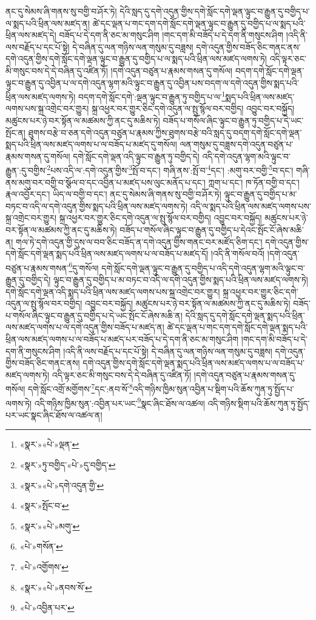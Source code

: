 ནང་དུ་སེམས་ཞི་གནས་སུ་བགྱི་བ་ཤོར་ཏེ། དེའི་སླད་དུ་དགེ་འདུན་གྱིས་དགེ་སློང་དགེ་ལྡན་ལྟུང་བ་རྒྱུན་དུ་བགྱིད་པ་ལ་སྨད་པའི་ཕྲིན་ལས་མཛད་ན། ཚེ་དང་ལྡན་པ་གང་དག་དགེ་སློང་དགེ་ལྡན་ལྟུང་བ་རྒྱུན་དུ་བགྱིད་པ་ལ་སྨད་པའི་ཕྲིན་ལས་མཛད་དེ། བཟོད་པ་དེ་དག་ནི་ཅང་མ་གསུང་ཤིག །གང་དག་མི་བཟོད་པ་དེ་དག་ནི་གསུངས་ཤིག །འདི་ནི་ལས་བརྗོད་པ་དང་པོ་སྟེ། དེ་བཞིན་དུ་ལན་གཉིས་ལན་གསུམ་དུ་བཟླས། དགེ་འདུན་གྱིས་བཟོད་ཅིང་གནང་ནས་དགེ་འདུན་གྱིས་དགེ་སློང་དགེ་ལྡན་ལྟུང་བ་རྒྱུན་དུ་བགྱིད་པ་ལ་སྨད་པའི་ཕྲིན་ལས་མཛད་ལགས་ཏེ། འདི་ལྟར་ཅང་མི་གསུང་བས་དེ་དེ་བཞིན་དུ་འཛིན་ཏོ། །དགེ་འདུན་བཙུན་པ་རྣམས་གསན་དུ་གསོལ། བདག་དགེ་སློང་དགེ་ལྡན་ལྟུང་བ་རྒྱུན་དུ་འབྱིན་པ་ལ་དགེ་འདུན་ལྷག་མའི་ལྟུང་བ་རྒྱུན་དུ་འབྱིན་པས་བདག་ལ་དགེ་འདུན་གྱིས་སྨད་པའི་ཕྲིན་ལས་མཛད་ལགས་ཏེ། བདག་དགེ་སློང་དགེ་:ལྡན་ལྟུང་བ་རྒྱུན་ཏུ་བགྱིད་པ་ལ་\footnote{«སྣར་»«པེ་»ལྡན་}སྨད་པའི་ཕྲིན་ལས་མཛད་ལགས་པས་སྐྲ་འགྲེང་བར་གྱུར། སྐྲ་འཕྱར་བར་གྱུར་ཅིང་དགེ་འདུན་ལ་སྤུ་སྙོལ་བར་བགྱིད། འབྱུང་བར་བསྐྱོད། མཚུངས་པར་ཉེ་བར་སྟོན་ལ་མཚམས་ཀྱི་ནང་དུ་མཆིས་ཏེ། བཟོད་པ་གསོལ་ཞིང་ལྟུང་བ་རྒྱུན་ཏུ་བགྱིད་པ་དེ་ཡང་སྤོང་ན། ཐུགས་བརྩེ་བ་ཅན་དགེ་འདུན་བཙུན་པ་རྣམས་ཀྱིས་ཐུགས་བརྩེ་བའི་སླད་དུ་བདག་དགེ་སློང་དགེ་ལྡན་སྨད་པའི་ཕྲིན་ལས་མཛད་ལགས་པ་ལ་བཟོད་པ་མཛད་དུ་གསོལ། ལན་གསུམ་དུ་བཟླས་དགེ་འདུན་བཙུན་པ་རྣམས་གསན་དུ་གསོལ། དགེ་སློང་དགེ་ལྡན་འདི་ལྟུང་བ་རྒྱུན་ཏུ་བགྱིད་དེ། འདི་དགེ་འདུན་ལྷག་མའི་ལྟུང་བ་རྒྱུན་:དུ་བགྱིས་\footnote{«སྣར་»ཏུ་བགྱིད་«པེ་»དུ་བགྱིད་}པས་འདི་ལ་:དགེ་འདུན་གྱིས་\footnote{«སྣར་»«པེ་»དགེ་འདུན་གྱི་}སྤོ་བ་དང་། གཞི་ནས་:སྤོ་བ་\footnote{«སྣར་»སྤོང་བ་}དང་། :མགུ་བར་བགྱི་\footnote{«སྣར་»«པེ་»མགུ་}བ་དང་། གཞི་ནས་མགུ་བར་བགྱི་བ་སྩོལ་བ་དང་འབྱིན་པ་མཛད་པས་ལུང་མནོད་པ་དང་། ཀླག་པ་དང་། ཁ་ཏོན་བགྱི་བ་དང་། རྣལ་འབྱོར་དང་། ཡིད་ལ་བགྱི་བ་དང་། ནང་དུ་སེམས་ཞི་གནས་སུ་བགྱི་བ་ཤོར་ཏེ། ལྟུང་བ་རྒྱུན་དུ་བགྱིད་པ་མ་བཏང་བ་འདི་ལ་དགེ་འདུན་གྱིས་སྨད་པའི་ཕྲིན་ལས་མཛད་ལགས་ཏེ། འདི་ལ་སྨད་པའི་ཕྲིན་ལས་མཛད་ལགས་པས་སྐྲ་འགྲེང་བར་གྱུར། སྐྲ་འཕྱར་བར་གྱུར་ཅིང་དགེ་འདུན་ལ་སྤུ་སྙོལ་བར་བགྱིད། འབྱུང་བར་བསྐྱོད། མཚུངས་པར་ཉེ་བར་སྟོན་ལ་མཚམས་ཀྱི་ནང་དུ་མཆིས་ཏེ། བཟོད་པ་གསོལ་ཞིང་ལྟུང་བ་རྒྱུན་དུ་བགྱིད་པ་དེའང་སྤོང་ངོ་ཞེས་མཆི་ན། གལ་ཏེ་དགེ་འདུན་གྱི་དུས་ལ་བབ་ཅིང་བཟོད་ན་དགེ་འདུན་གྱིས་གནང་བར་མཛོད་ཅིག་དང་། དགེ་འདུན་གྱིས་དགེ་སློང་དགེ་ལྡན་སྨད་པའི་ཕྲིན་ལས་མཛད་ལགས་པ་ལ་བཟོད་པ་མཛད་དོ། །འདི་ནི་གསོལ་བའོ། །དགེ་འདུན་བཙུན་པ་རྣམས་གསན་\footnote{«པེ་»གསོན་}དུ་གསོལ། དགེ་སློང་དགེ་ལྡན་ལྟུང་བ་རྒྱུན་དུ་བགྱིད་པ་འདི་དགེ་འདུན་ལྷག་མའི་ལྟུང་བ་རྒྱུན་དུ་བགྱིད་དེ། ལྟུང་བ་རྒྱུན་དུ་བགྱིད་པ་མ་བཏང་བ་འདི་ལ་དགེ་འདུན་གྱིས་སྨད་པའི་ཕྲིན་ལས་མཛད་ལགས་ཏེ། དགེ་སློང་དགེ་ལྡན་འདི་སྨད་པའི་ཕྲིན་ལས་མཛད་ལགས་པས་སྐྲ་འགྲེང་བར་གྱུར། སྐྲ་འཕྱར་བར་གྱུར་ཅིང་དགེ་འདུན་ལ་སྤུ་སྙོལ་བར་བགྱིད། འབྱུང་བར་བསྐྱོད། མཚུངས་པར་ཉེ་བར་སྟོན་ལ་མཚམས་ཀྱི་ནང་དུ་མཆིས་ཏེ། བཟོད་པ་གསོལ་ཞིང་ལྟུང་བ་རྒྱུན་དུ་བགྱིད་པ་དེ་ཡང་སྤོང་ངོ་ཞེས་མཆི་ན། དེའི་སླད་དུ་དགེ་སློང་དགེ་ལྡན་སྨད་པའི་ཕྲིན་ལས་མཛད་ལགས་པ་ལ་དགེ་འདུན་གྱིས་བཟོད་པ་མཛད་ན། ཚེ་དང་ལྡན་པ་གང་དག་དགེ་སློང་དགེ་ལྡན་སྨད་པའི་ཕྲིན་ལས་མཛད་ལགས་པ་ལ་བཟོད་པ་མཛད་པར་བཟོད་པ་དེ་དག་ནི་ཅང་མ་གསུང་ཤིག །གང་དག་མི་བཟོད་པ་དེ་དག་ནི་གསུངས་ཤིག །འདི་ནི་ལས་བརྗོད་པ་དང་པོ་སྟེ། དེ་བཞིན་དུ་ལན་གཉིས་ལན་གསུམ་དུ་བཟླས། དགེ་འདུན་གྱིས་བཟོད་ཅིང་གནང་ནས། དགེ་འདུན་གྱིས་དགེ་སློང་དགེ་ལྡན་སྨད་པའི་ཕྲིན་ལས་མཛད་ལགས་པ་ལ་བཟོད་པ་མཛད་ལགས་ཏེ། འདི་ལྟར་ཅང་མི་གསུང་བས་དེ་དེ་བཞིན་དུ་འཛིན་ཏོ། །དགེ་འདུན་བཙུན་པ་རྣམས་གསན་དུ་གསོལ། དགེ་སློང་འགྲོ་མགྱོགས་\footnote{«པེ་»འགྱོགས་}དང་:ནབ་སོ་\footnote{«སྣར་»«པེ་»ནབས་སོ་}འདི་གཉིས་ཁྱིམ་སུན་འབྱིན་པ་སྡིག་པའི་ཆོས་ཀུན་ཏུ་སྤྱོད་པ་ལགས་ཏེ། འདི་གཉིས་ཁྱིམ་སུན་:འབྱིན་པར་ཡང་\footnote{«པེ་»འབྱིན་པར་}སྣང་ཞིང་ཐོས་ལ་འཚལ། འདི་གཉིས་སྡིག་པའི་ཆོས་ཀུན་ཏུ་སྤྱོད་པར་ཡང་སྣང་ཞིང་ཐོས་ལ་འཚལ་ན། 